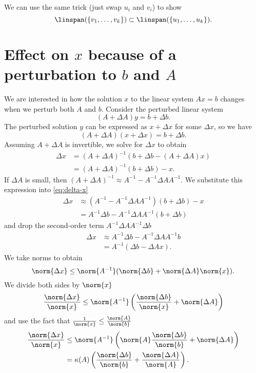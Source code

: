 \documentclass[preprint]{imsart}
\numberwithin{equation}{section}
\numberwithin{equation}{section}
\theoremstyle{plain}
\theoremstyle{remark}
\newtheorem{remark}{*Remark}
\begin{document}

We can use the same trick (just swap $u_i$ and $v_i$) to show 
$$
\linspan(\{v_1,\dots,v_k\})\subset \linspan(\{u_1,\dots,u_k\}).
$$

\section{Effect on $x$ because of a perturbation to $b$ and $A$}

We are interested in how the solution $x$ to the linear system $Ax = b$ changes when we perturb both $A$ and $b$. Consider the perturbed linear system
$$
(A + \Delta A)y = b + \Delta b.
$$
The perturbed solution $y$ can be expressed as $x + \Delta x$ for some $\Delta x$, so we have
$$
(A + \Delta A)(x + \Delta x) = b + \Delta b.
$$
Assuming $A + \Delta A$ is invertible, we solve for $\Delta x$ to obtain
\begin{align}
\Delta x &= (A + \Delta A)^{-1}(b + \Delta b - (A + \Delta A)x) \\
&= (A + \Delta A)^{-1}(b + \Delta b) - x.
\label{eq:delta-x}
\end{align}
If $\Delta A$ is small, then $(A + \Delta A)^{-1}\approx A^{-1} - A^{-1}\Delta A A^{-1}$. We substitute this expression into \eqref{eq:delta-x} 
\begin{align*}
\Delta x &\approx (A^{-1} - A^{-1}\Delta A A^{-1})(b + \Delta b) - x \\
&= A^{-1}\Delta b - A^{-1}\Delta A A^{-1}(b + \Delta b) 
\end{align*}
and drop the second-order term $A^{-1}\Delta A A^{-1}\Delta b$ 
\begin{align*}
\Delta x &\approx A^{-1}\Delta b - A^{-1}\Delta A A^{-1}b \\
& = A^{-1}(\Delta b - \Delta A x).
\end{align*}
We take norms to obtain
$$
\norm{\Delta x} \le \norm{A^{-1}}(\norm{\Delta b} + \norm{\Delta A}\norm{x}).
$$
We divide both sides by $\norm{x}$ 
$$
\frac{\norm{\Delta x}}{\norm{x}} \le \norm{A^{-1}}\left(\frac{\norm{\Delta b}}{\norm{x}} + \norm{\Delta A}\right)
$$
and use the fact that $\frac{1}{\norm{x}} \le \frac{\norm{A}}{\norm{b}}$ 
\begin{align*}
\frac{\norm{\Delta x}}{\norm{x}} &\le \norm{A^{-1}}\left(\norm{A}\frac{\norm{\Delta b}}{\norm{b}} + \norm{\Delta A}\right) \\
&= \kappa(A)\left(\frac{\norm{\Delta b}}{\norm{b}} + \frac{\norm{\Delta A}}{\norm{A}}\right).
\end{align*}
\end{document}

